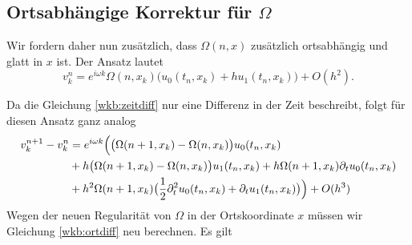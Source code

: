 \subsection*{Ortsabhängige Korrektur für $\Omega$}

Wir fordern daher nun zusätzlich, dass $\Omega(n,x)$ zusätzlich ortsabhängig und glatt in $x$ ist.
Der Ansatz lautet
\[ v^n_k = e^{i \omega k} \Omega(n, x_k) \bigl( u_0(t_n, x_k) + h u_1(t_n, x_k) \bigr) + O(h^2). \]

Da die Gleichung \eqref{wkb:zeitdiff} nur eine Differenz in der Zeit beschreibt, folgt für diesen Ansatz ganz analog
\begin{align}
\begin{split}
v^{n+1}_k - v^n_k &= e^{i \omega k} \Bigl( \bigl(\Omega(n+1, x_k) - \Omega(n,x_k) \bigr) u_0(t_n, x_k)\\
&+ h \bigl(\Omega(n+1,x_k) - \Omega(n,x_k) \bigr) u_1(t_n, x_k) + h \Omega(n+1, x_k) \partial_t u_0(t_n, x_k)\\
&+ h^2 \Omega(n+1, x_k) \bigl( \frac{1}{2} \partial^2_t u_0(t_n, x_k) + \partial_t u_1(t_n, x_k) \bigr) \Bigr) + O(h^3)
\end{split}
\end{align}
Wegen der neuen Regularität von $\Omega$ in der Ortskoordinate $x$ müssen wir Gleichung \eqref{wkb:ortdiff} neu berechnen.
Es gilt

